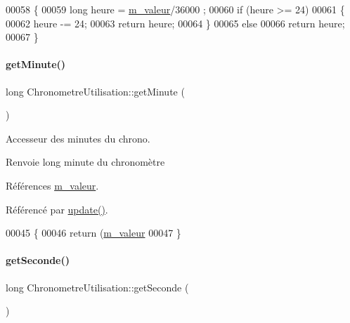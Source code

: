 \begin{DoxyCode}
00058 \{
00059     \textcolor{keywordtype}{long} heure = \hyperlink{class_chronometre_utilisation_a7ef8b30ae4b6db56b9be832c847186ea}{m\_valeur}/36000 ;
00060     \textcolor{keywordflow}{if} (heure >= 24)
00061     \{
00062         heure -= 24;
00063         \textcolor{keywordflow}{return} heure;
00064     \}
00065     \textcolor{keywordflow}{else}
00066     \textcolor{keywordflow}{return} heure;
00067 \}
\end{DoxyCode}
\mbox{\label{class_chronometre_utilisation_a2c137076fcda83a14a5bad01b915196f}} 
\paragraph{\texorpdfstring{get\+Minute()}{getMinute()}}
{\footnotesize\ttfamily long Chronometre\+Utilisation\+::get\+Minute (\begin{DoxyParamCaption}{ }\end{DoxyParamCaption})}

Accesseur des minutes du chrono.

\begin{DoxyReturn}{Renvoie}
long minute du chronomètre 
\end{DoxyReturn}


Références \hyperlink{class_chronometre_utilisation_a7ef8b30ae4b6db56b9be832c847186ea}{m\+\_\+valeur}.



Référencé par \hyperlink{class_chronometre_utilisation_add760c3052342baec482fe0752a89b86}{update()}.


\begin{DoxyCode}
00045 \{
00046     \textcolor{keywordflow}{return} (\hyperlink{class_chronometre_utilisation_a7ef8b30ae4b6db56b9be832c847186ea}{m\_valeur}%
00047 \}
\end{DoxyCode}
\mbox{\label{class_chronometre_utilisation_a62dde8f710b8e015ba6124e8b44fe2da}} 
\paragraph{\texorpdfstring{get\+Seconde()}{getSeconde()}}
{\footnotesize\ttfamily long Chronometre\+Utilisation\+::get\+Seconde (\begin{DoxyParamCaption}{ }\end{DoxyParamCaption})}

